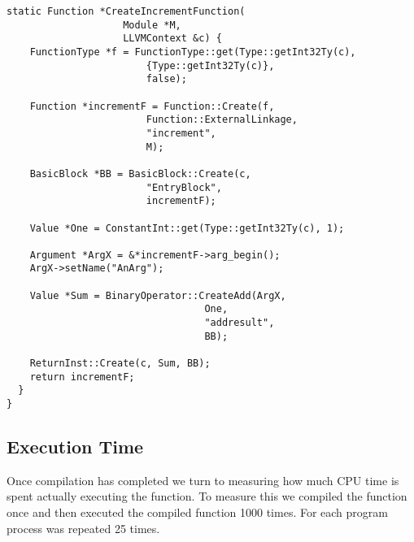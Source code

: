 \begin{lstlisting}[float,floatplacement=H,
  caption={Generating MCJIT IR for the increment program.},
  label=lst:llvm_increment]
  static Function *CreateIncrementFunction(
                    Module *M, 
                    LLVMContext &c) {
    FunctionType *f = FunctionType::get(Type::getInt32Ty(c), 
                        {Type::getInt32Ty(c)}, 
                        false);
    
    Function *incrementF = Function::Create(f, 
                        Function::ExternalLinkage, 
                        "increment", 
                        M);

    BasicBlock *BB = BasicBlock::Create(c, 
                        "EntryBlock", 
                        incrementF);
    
    Value *One = ConstantInt::get(Type::getInt32Ty(c), 1);
    
    Argument *ArgX = &*incrementF->arg_begin(); 
    ArgX->setName("AnArg");
  
    Value *Sum = BinaryOperator::CreateAdd(ArgX, 
                                  One,
                                  "addresult", 
                                  BB);
  
    ReturnInst::Create(c, Sum, BB);
    return incrementF;
  }
}\end{lstlisting}

\subsection{Execution Time}
Once compilation has completed we turn to measuring how much CPU time is spent actually executing the function.
To measure this we compiled the function once and then executed the compiled function 1000 times.
For each program process was repeated 25 times.
